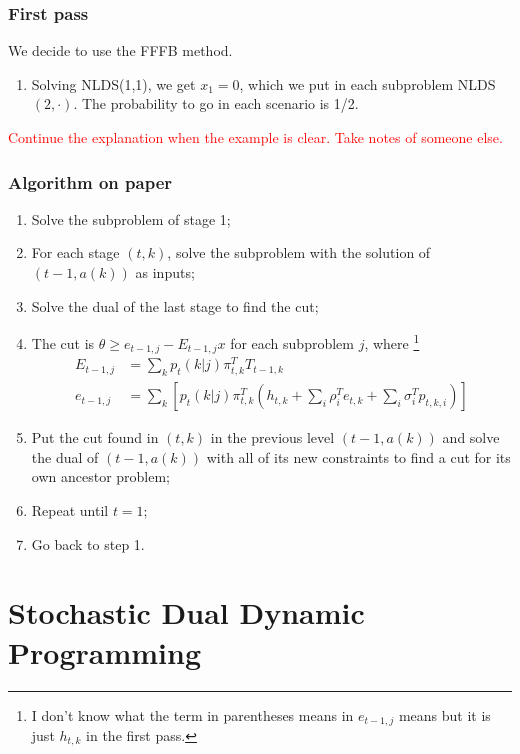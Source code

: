 \documentclass[12pt, openany]{report}
\theoremstyle{definition}
\begin{document}
\subsection{First pass}
We decide to use the FFFB method. 
\begin{enumerate}
	\item Solving NLDS(1,1), we get $x_1=0$, which we put in each subproblem NLDS$(2,\cdot)$. The probability to go in each scenario is 1/2. 
\end{enumerate}
\textcolor{red}{Continue the explanation when the example is clear. Take notes of someone else.}
\subsection{Algorithm on paper}
\begin{enumerate}
	\item Solve the subproblem of stage 1;
	\item For each stage $(t,k)$, solve the subproblem with the solution of $(t-1, a(k))$ as inputs;
	\item Solve the dual of the last stage to find the cut;
	\item The cut is $\theta \ge e_{t-1,j}-E_{t-1,j}x$ for each subproblem $j$, where \footnote{I don't know what the term in parentheses means in $e_{t-1,j}$ means but it is just $h_{t,k}$ in the first pass.}
	\begin{equation}
		\begin{aligned}
			E_{t-1,j} &= \sum_k p_t(k|j)\pi_{t,k}^T T_{t-1,k}\\
			e_{t-1,j} &= \sum_k \left[p_t(k|j)\pi_{t,k}^T \left(h_{t,k}+\sum_i \rho_i^T e_{t,k} + \sum_i \sigma_i^T p_{t,k,i}\right)\right]
		\end{aligned}
	\end{equation}
	\item Put the cut found in $(t,k)$ in the previous level $(t-1,a(k))$ and solve the dual of $(t-1,a(k))$ with all of its new constraints to find a cut for its own ancestor problem;
	\item Repeat until $t=1$;
	\item Go back to step 1.
\end{enumerate}
\chapter{Stochastic Dual Dynamic Programming}
\end{document}
